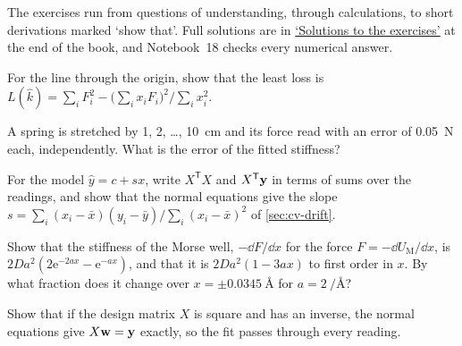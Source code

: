 \label{sec:lo-exercises}

The exercises run from questions of understanding, through calculations,
to short derivations marked `show that'. Full solutions are in
\hyperref[sec:lo-solutions]{`Solutions to the exercises'} at the end of
the book, and Notebook~18 checks every numerical answer.

\begin{exercise}
\label{ex:lo-least}
For the line through the origin, show that the least loss is
$L(\hat k) = \sum_iF_i^2 - \bigl(\sum_ix_iF_i\bigr)^2/\sum_ix_i^2$.
\end{exercise}

\begin{exercise}
\label{ex:lo-error}
A spring is stretched by 1, 2, \dots, \SI{10}{\centi\metre} and its force
read with an error of \SI{0.05}{\newton} each, independently. What is
the error of the fitted stiffness?
\end{exercise}

\begin{exercise}
\label{ex:lo-intercept}
For the model $\hat y = c + sx$, write $X^{\mathsf T}X$ and $X^{\mathsf
T}\bm{\mathrm{y}}$ in terms of sums over the readings, and show that the normal
equations give the slope $s = \sum_i(x_i - \bar x)(y_i - \bar y)/\sum_i(x_i
- \bar x)^2$ of \cref{sec:cv-drift}.
\end{exercise}

\begin{exercise}
\label{ex:lo-stiffness}
Show that the stiffness of the Morse well, $-\dd F/\dd x$ for the force
$F = -\dd U_{\mathrm M}/\dd x$, is $2Da^2(2\mathrm{e}^{-2ax} -
\mathrm{e}^{-ax})$, and that it is $2Da^2(1 - 3ax)$ to first order in
$x$. By what fraction does it change over $x = \pm\SI{0.0345}{\angstrom}$
for $a = \SI{2}{\per\angstrom}$?
\end{exercise}

\begin{exercise}
\label{ex:lo-square}
Show that if the design matrix $X$ is square and has an inverse, the
normal equations give $X\bm{\mathrm{w}} = \bm{\mathrm{y}}$ exactly, so the fit passes
through every reading.
\end{exercise}

